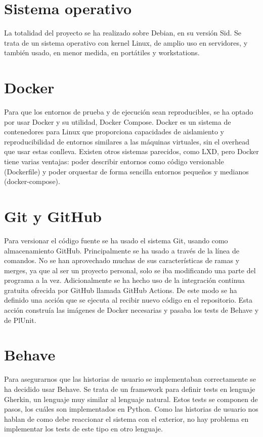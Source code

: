 \documentclass[12pt]{report} %
\begin{document}
\section{Sistema operativo}
La totalidad del proyecto se ha realizado sobre Debian, en su versión Sid. Se trata de un sistema operativo con kernel Linux, 
de amplio uso en servidores, y también usado, en menor medida, en portátiles y workstations.

\section{Docker}
Para que los entornos de prueba y de ejecución sean reproducibles, se ha optado por usar Docker y su utilidad, Docker Compose.
Docker es un sistema de contenedores para Linux que proporciona capacidades de aislamiento y reproducibilidad de entornos similares a las máquinas virtuales, sin el overhead que usar estas conlleva.
Existen otros sistemas parecidos, como LXD, pero Docker tiene varias ventajas: poder describir entornos como código versionable (Dockerfile) y poder orquestar de forma sencilla entornos pequeños y medianos (docker-compose).

\section{Git y GitHub}
Para versionar el código fuente se ha usado el sistema Git, usando como almacenamiento GitHub. Principalmente se ha usado a través de la línea de comandos.
No se han aprovechado muchas de sus características de ramas y merges, ya que al ser un proyecto personal, solo se iba modificando una parte del programa a la vez.
Adicionalmente se ha hecho uso de la integración continua gratuita ofrecida por GitHub llamada GitHub Actions. De este modo se ha definido una acción que se ejecuta al recibir nuevo código en el repositorio.
Esta acción construía las imágenes de Docker necesarias y pasaba los tests de Behave y de PlUnit.

\section{Behave}
Para asegurarnos que las historias de usuario se implementaban correctamente se ha decidido usar Behave.
Se trata de un framework para definir tests en lenguaje Gherkin, un lenguaje muy similar al lenguaje natural. Estos tests se componen de pasos,
los cuáles son implementados en Python. Como las historias de usuario nos hablan de como debe reaccionar el sistema con el exterior, no hay problema en implementar los tests de este tipo en otro lenguaje.





\end{document}
